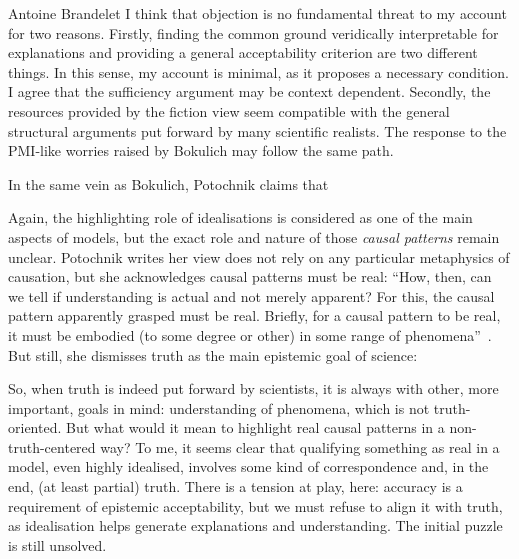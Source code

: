 \begin{artengenv}{Antoine Brandelet}
I think that objection is no fundamental threat to my account for two reasons. Firstly, finding the common ground veridically interpretable for explanations and providing a general acceptability criterion are two different things. In this sense, my account is minimal, as it proposes a necessary condition. I agree that the sufficiency argument may be context dependent. Secondly, the resources provided by the fiction view seem compatible with the general structural arguments put forward by many scientific realists. The response to the PMI-like worries raised by Bokulich may follow the same path.

In the same vein as Bokulich, Potochnik claims that


Again, the highlighting role of idealisations is considered as one of the main aspects of models, but the exact role and nature of those \textit{causal patterns} remain unclear. Potochnik writes her view does not rely on any particular metaphysics of causation, but she acknowledges causal patterns must be real: ``How, then, can we tell if understanding is actual and not merely apparent? For this, the causal pattern apparently grasped must be real. Briefly, for a causal pattern to be real, it must be embodied (to some degree or other) in some range of phenomena''~\parencite[p.115]{Potochnik2017}. But still, she dismisses truth as the main epistemic goal of science: 


So, when truth is indeed put forward by scientists, it is always with other, more important, goals in mind: understanding of phenomena, which is not truth-oriented. But what would it mean to highlight real causal patterns in a non-truth-centered way? To me, it seems clear that qualifying something as real in a model, even highly idealised, involves some kind of correspondence and, in the end, (at least partial) truth. There is a tension at play, here: accuracy is a requirement of epistemic acceptability, but we must refuse to align it with truth, as idealisation helps generate explanations and understanding. The initial puzzle is still unsolved.


\end{artengenv}
